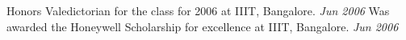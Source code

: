 \documentclass{resume}
\renewcommand{\labelcitem}{}
\newcommand{\period}{\hfill\small\sl}
\begin{document}
\renewcommand{\labelcitem}{$\diamond$}


\begin{category}{Honors}
    \citembullet Valedictorian for the class for 2006 at IIIT, Bangalore. {\period Jun 2006}
    \citembullet Was awarded the Honeywell Scholarship for excellence at IIIT, Bangalore. {\period Jun 2006}
\end{category}
\end{document}
